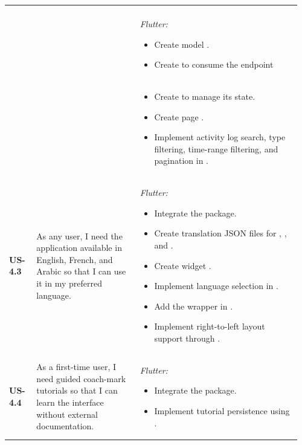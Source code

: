 \begin{longtable}{@{} P{0.09\linewidth} P{0.34\linewidth} P{0.53\linewidth} @{}}
\begin{itemize}[nosep, leftmargin=*]
  \end{itemize}
  \\ & &
  \noindent\textit{Flutter:}
  \begin{itemize}[nosep, leftmargin=*]
    \item Create model .
    \item Create  to consume the  endpoint 
  \end{itemize} \\ & &
  \begin{itemize}[nosep, leftmargin=*]
    \item Create  to manage its state.
    \item Create page .
    \item Implement activity log search, type filtering, time-range filtering, and pagination in .
  \end{itemize} \\
  \midrule
  \textbf{US-4.3}
  & As any user, I need the application available in English, French, and
  Arabic so that I can use it in my preferred language.
  & \noindent\textit{Flutter:}
  \begin{itemize}[nosep, leftmargin=*]
    \item Integrate the  package.
    \item Create translation JSON files for , , and .
    \item Create widget .
    \item Implement language selection in .
    \item Add the  wrapper in .
    \item Implement right-to-left layout support through .
  \end{itemize} \\
  \midrule
  \textbf{US-4.4}
  & As a first-time user, I need guided coach-mark tutorials so that I can
  learn the interface without external documentation.
  & \noindent\textit{Flutter:}
  \begin{itemize}[nosep, leftmargin=*]
    \item Integrate the  package.
    \item Implement tutorial persistence using .

\end{itemize}
\end{longtable}
